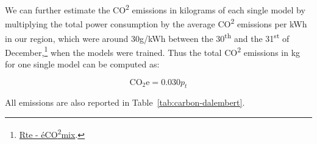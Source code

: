 We can further estimate the CO\textsuperscript{2} emissions in kilograms of each single model by multiplying the total power consumption by the average CO\textsuperscript{2} emissions per kWh in our region, which were around 30g/kWh between the 30\textsuperscript{th} and the 31\textsuperscript{st} of December,\footnote{\href{https://www.rte-france.com/eco2mix/les-emissions-de-co2-par-kwh-produit-en-france}{Rte - éCO\textsuperscript{2}mix}.} when the models were trained. Thus the total CO\textsuperscript{2} emissions in kg for one single model can be computed as:

\begin{equation*}
    \text{CO}_{2}\text{e} = 0.030 p_t
\end{equation*}

All emissions are also reported in Table~\ref{tab:carbon-dalembert}.